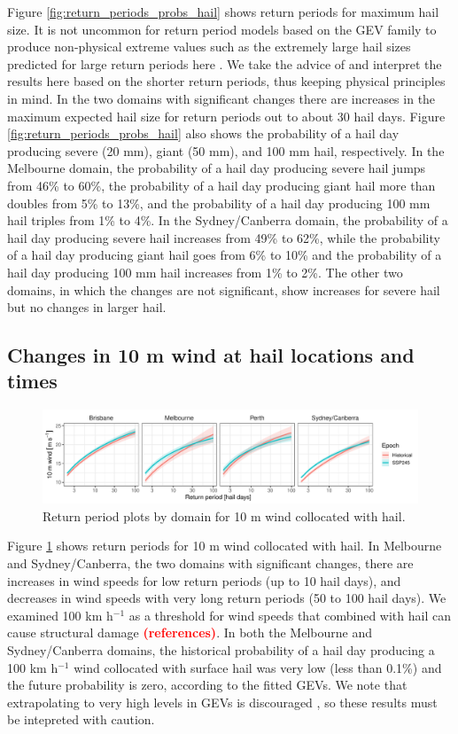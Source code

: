 \documentclass[]{agujournal2019}\usepackage[]{graphicx}\usepackage[]{xcolor}
\newcommand*{\todo}[1]{\textbf{\textcolor{red}{(#1)}}}
\begin{document}
Figure \ref{fig:return_periods_probs_hail} shows return periods for maximum hail size. It is not uncommon for return period models based on the GEV family to produce non-physical extreme values such as the extremely large hail sizes predicted for large return periods here \cite[p. 66]{Coles_2001}. We take the advice of  and interpret the results here based on the shorter return periods, thus keeping physical principles in mind. In the two domains with significant changes there are increases in the maximum expected hail size for return periods out to about 30 hail days. Figure \ref{fig:return_periods_probs_hail} also shows the probability of a hail day producing severe (20 mm), giant (50 mm), and 100 mm hail, respectively. In the Melbourne domain, the probability of a hail day producing severe hail jumps from 46\% to 60\%, the probability of a hail day producing giant hail more than doubles from 5\% to 13\%, and the probability of a hail day producing 100 mm hail triples from 1\% to 4\%. In the Sydney/Canberra domain, the probability of a hail day producing severe hail increases from 49\% to 62\%, while the probability of a hail day producing giant hail goes from 6\% to 10\% and the probability of a hail day producing 100 mm hail increases from 1\% to 2\%. The other two domains, in which the changes are not significant, show increases for severe hail but no changes in larger hail.

\subsection{Changes in 10 m wind at hail locations and times}

\begin{figure}[!ht]
      \includegraphics[width=\textwidth]{figures/return_periods_wind}
      \caption{Return period plots by domain for 10 m wind collocated with hail.}
      \label{fig:return_periods_wind}
\end{figure}



Figure \ref{fig:return_periods_wind} shows return periods for 10 m wind collocated with hail. In Melbourne and Sydney/Canberra, the two domains with significant changes, there are increases in wind speeds for low return periods (up to 10 hail days), and decreases in wind speeds with very long return periods (50 to 100 hail days). We examined 100 km h$^{-1}$ as a threshold for wind speeds that combined with hail can cause structural damage \todo{references}. In both the Melbourne and Sydney/Canberra domains, the historical probability of a hail day producing a 100 km h$^{-1}$ wind collocated with surface hail was very low (less than 0.1\%) and the future probability is zero, according to the fitted GEVs. We note that extrapolating to very high levels in GEVs is discouraged \cite{Coles_2001}, so these results must be intepreted with caution.
\end{document}

